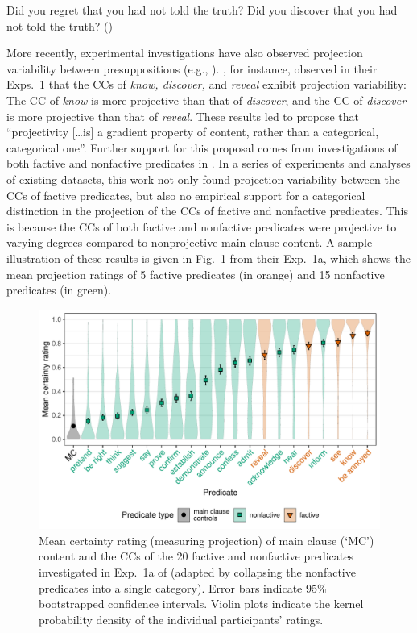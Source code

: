 \documentclass[11pt,fleqn]{article}
\newcommand{\6}{\mbox{$[\hspace*{-.6mm}[$}}
\newcommand{\9}{\mbox{$]\hspace*{-.6mm}]$}}
\begin{document}
\begin{exe}
\ex\label{kart}
\begin{xlist}
\ex Did you regret that you had not told the truth?
\ex Did you discover that you had not told the truth? \hfill (\citealt[63]{karttunen71b})
\end{xlist}
\end{exe}
More recently, experimental investigations have also observed projection variability between presuppositions (e.g., \citealt*{xue-onea11,demarneffe-etal-sub23,tbd-variability,degen-tonhauser-language}). \citealt{tbd-variability}, for instance, observed in their Exps.~1 that the CCs of {\em know, discover,} and {\em reveal} exhibit projection variability: The CC of {\em know} is more projective than that of {\em discover}, and the CC of {\em discover} is more projective than that of {\em reveal}. These results led \citealt[498]{tbd-variability} to propose that ``projectivity [\ldots is] a gradient property of content, rather than a categorical, categorical one''. Further support for this proposal comes from  investigations of both factive and nonfactive predicates in \citealt{degen-tonhauser-language}. In a series of experiments and analyses of existing datasets, this work not only found projection variability between the CCs of factive predicates, but also no empirical support for a categorical distinction in the projection of the CCs of factive and nonfactive predicates. This is because the CCs of both factive and nonfactive predicates were projective to varying degrees compared to nonprojective main clause content. A sample illustration of these results is given in Fig.~\ref{fig:dt1a} from their Exp.~1a, which shows the mean projection ratings of 5 factive predicates (in \color{orange}orange\color{black}) and 15 nonfactive predicates (in \color{green}green\color{black}).

\begin{figure}[h!]
\centering
\includegraphics[width=.8\textwidth]{../../results/main/13explicitIgnorance/graphs/mean-certainty-by-predicateType}
\caption{Mean certainty rating (measuring projection) of main clause (`MC') content and the CCs of the 20 \color{orange}factive \color{black} and \color{green}nonfactive \color{black} predicates investigated in Exp.~1a of \citealt{degen-tonhauser-language} (adapted by collapsing the nonfactive predicates into a single category). Error bars indicate 95\% bootstrapped confidence intervals. Violin plots indicate the kernel probability density of the individual participants' ratings.}\label{fig:dt1a}
\end{figure}
\end{document}
